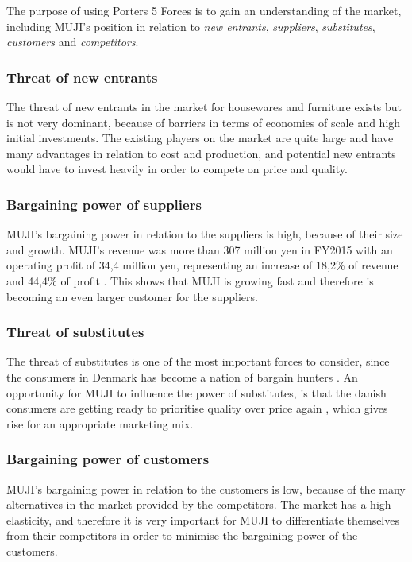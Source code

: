 The purpose of using Porters 5 Forces is to gain an understanding of the market, including MUJI's position in relation to \textit{new entrants}, \textit{suppliers}, \textit{substitutes}, \textit{customers} and \textit{competitors}.

\subsubsection{Threat of new entrants}
The threat of new entrants in the market for housewares and furniture exists but is not very dominant, because of barriers in terms of economies of scale and high initial investments. The existing players on the market are quite large and have many advantages in relation to cost and production, and potential new entrants would have to invest heavily in order to compete on price and quality.

\subsubsection{Bargaining power of suppliers}
MUJI's bargaining power in relation to the suppliers is high, because of their size and growth. MUJI's revenue was more than 307 million yen in FY2015 with an operating profit of 34,4 million yen, representing an increase of 18,2\% of revenue and 44,4\% of profit \cite[2]{Annual}. This shows that MUJI is growing fast and therefore is becoming an even larger customer for the suppliers.     

\subsubsection{Threat of substitutes}
The threat of substitutes is one of the most important forces to consider, since the consumers in Denmark has become a nation of bargain hunters \cite[35]{ConsumerLifestyles}. An opportunity for MUJI to influence the power of substitutes, is that the danish consumers are getting ready to prioritise quality over price again \cite[35]{ConsumerLifestyles}, which gives rise for an appropriate marketing mix. 

\subsubsection{Bargaining power of customers}
MUJI's bargaining power in relation to the customers is low, because of the many alternatives in the market provided by the competitors. The market has a high elasticity, and therefore it is very important for MUJI to differentiate themselves from their competitors in order to minimise the bargaining power of the customers.

